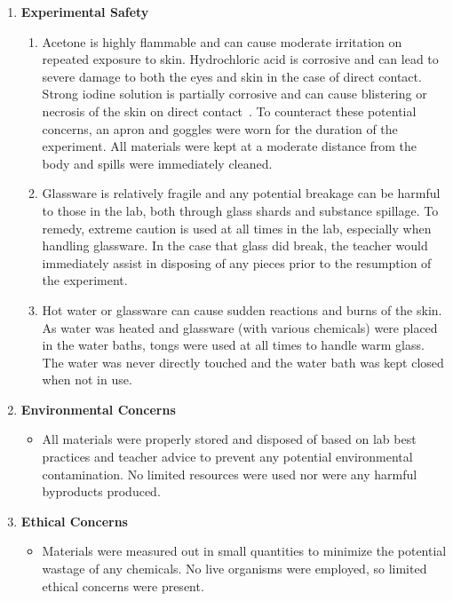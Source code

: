 \begin{enumerate}[label=(\alph*),itemsep=-1ex]
	\item \textbf{Experimental Safety}
		\begin{enumerate}[label=(\roman*)]
			\item Acetone is highly flammable and can cause moderate irritation on repeated exposure to skin. Hydrochloric acid is corrosive and can lead to severe damage to both the eyes and skin in the case of direct contact. Strong iodine solution is partially corrosive and can cause blistering or necrosis of the skin on direct contact~\parencite{acetone, acid, iodoacetone}. To counteract these potential concerns, an apron and goggles were worn for the duration of the experiment. All materials were kept at a moderate distance from the body and spills were immediately cleaned.
			\item Glassware is relatively fragile and any potential breakage can be harmful to those in the lab, both through glass shards and substance spillage. To remedy, extreme caution is used at all times in the lab, especially when handling glassware. In the case that glass did break, the teacher would immediately assist in disposing of any pieces prior to the resumption of the experiment. 
			\item Hot water or glassware can cause sudden reactions and burns of the skin. As water was heated and glassware (with various chemicals) were placed in the water baths, tongs were used at all times to handle warm glass. The water was never directly touched and the water bath was kept closed when not in use.
		\end{enumerate}
	\item \textbf{Environmental Concerns}
	\begin{itemize}[label={}]
	  \item All materials were properly stored and disposed of based on lab best practices and teacher advice to prevent any potential environmental contamination. No limited resources were used nor were any harmful byproducts produced.
	\end{itemize}
	\item \textbf{Ethical Concerns}
	\begin{itemize}[label={}]
	  \item Materials were measured out in small quantities to minimize the potential wastage of any chemicals. No live organisms were employed, so limited ethical concerns were present.
	\end{itemize}
\end{enumerate}


